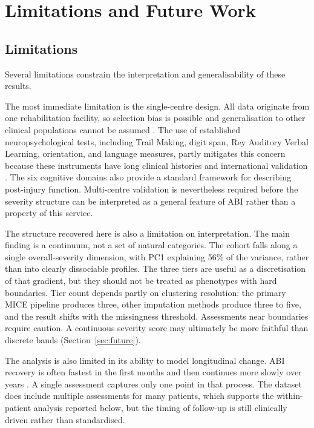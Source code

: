 
\chapter{Limitations and Future Work}\label{Chapter6}


\section{Limitations}\label{sec:limits}

Several limitations constrain the interpretation and generalisability of these results.

The most immediate limitation is the single-centre design. All data originate from one rehabilitation facility, so selection bias is possible and generalisation to other clinical populations cannot be assumed \parencite{corrigan2010epidemiology}. The use of established neuropsychological tests, including Trail Making, digit span, Rey Auditory Verbal Learning, orientation, and language measures, partly mitigates this concern because these instruments have long clinical histories and international validation \parencite{lezak2012neuropsychological}. The six cognitive domains also provide a standard framework for describing post-injury function. Multi-centre validation is nevertheless required before the severity structure can be interpreted as a general feature of ABI rather than a property of this service.

The structure recovered here is also a limitation on interpretation. The main finding is a continuum, not a set of natural categories. The cohort falls along a single overall-severity dimension, with PC1 explaining 56\% of the variance, rather than into clearly dissociable profiles. The three tiers are useful as a discretisation of that gradient, but they should not be treated as phenotypes with hard boundaries. Tier count depends partly on clustering resolution: the primary MICE pipeline produces three, other imputation methods produce three to five, and the result shifts with the missingness threshold. Assessments near boundaries require caution. A continuous severity score may ultimately be more faithful than discrete bands (Section~\ref{sec:future}).

The analysis is also limited in its ability to model longitudinal change. ABI recovery is often fastest in the first months and then continues more slowly over years \parencite{ponsford2014longitudinal, maas2017traumatic}. A single assessment captures only one point in that process. The dataset does include multiple assessments for many patients, which supports the within-patient analysis reported below, but the timing of follow-up is still clinically driven rather than standardised.

